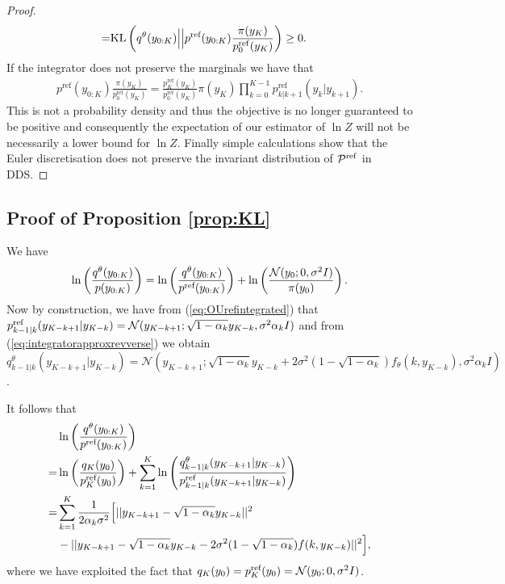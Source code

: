 \documentclass{article} %
\begin{document}
\begin{proof}
\begin{align}
    =&  \KL\left(q^\theta(y_{0:K})\Big|\Big|{p}^{\textup{ref}}(y_{0:K}) \frac{\pi(y_K)}{p_0^{\mathrm{ref}}(y_K)} \right) \geq 0. \nonumber
\end{align}
If the integrator does not preserve the marginals we have that
\begin{align}
     p^{\mathrm{ref}} (y_{0:K})  \frac{\pi(y_K)}{p_0^{\mathrm{ref}}(y_K)} =  \frac{p_K^{\mathrm{ref}}(y_K)}{p_0^{\mathrm{ref}}(y_K)}\pi(y_K)\prod_{k=0}^{K-1}  p^{\mathrm{ref}}_{k| k+1} (y_{k}| y_{k+1}).
\end{align}
This is not a probability density and thus the objective is no longer guaranteed to be positive and consequently the expectation of our estimator of $\ln Z$ will not be necessarily a lower bound for $\ln Z$. Finally simple calculations show that the Euler discretisation does not preserve the invariant distribution of $\gP^{\mathrm{ref}}$ in DDS.
\end{proof}


\subsection{Proof of Proposition \ref{prop:KL}}
We have 
\begin{equation}\label{eq:logRNsum}
    \log \left( \frac{q^{\theta}(y_{0:K})}{p(y_{0:K})}\right)=\log  \left(\frac{q^{\theta}(y_{0:K})}{p^{\textup{ref}}(y_{0:K})}\right)+\log  \left( \frac{\mathcal{N}(y_0;0,\sigma^2 I)}{\pi(y_0)}\right).
\end{equation}
Now by construction, we have from (\ref{eq:OUrefintegrated}) that  $p^{\textup{ref}}_{k-1|k}(y_{K-k+1}|y_{K-k})=\mathcal{N}(y_{K-k+1};\sqrt{1-\alpha_k}y_{K-k},\sigma^2 \alpha_k I)$ and from (\ref{eq:integratorapproxrevverse}) we obtain $q^{\theta}_{k-1|k}(y_{K-k+1}|y_{K-k})=\mathcal{N}(y_{K-k+1};\sqrt{1-\alpha_k}y_{K-k}+2\sigma^2(1-\sqrt{1-\alpha_k})f_{\theta}(k,y_{K-k}),\sigma^2 \alpha_k I)$.

It follows that 
\begin{align}
    &\log  \left(\frac{q^{\theta}(y_{0:K})}{p^{\textup{ref}}(y_{0:K})}\right)  \label{eq:rationvareps1} \\
    =&\log \left( \frac{q_{K}(y_0)}{p^{\textup{ref}}_{K}(y_0)} \right)+\sum_{k=1}^K 
    \log \left( \frac{q^{\theta}_{k-1|k}(y_{K-k+1}|y_{K-k})}{p^{\textup{ref}}_{k-1|k}(y_{K-k+1}|y_{K-k})} \right) \nonumber \\
    =& \sum_{k=1}^K  \frac{1}{2\alpha_k \sigma^2} \Bigr[ ||y_{K-k+1}-\sqrt{1-\alpha_k}y_{K-k}||^2 \nonumber\\
    &- ||y_{K-k+1}-\sqrt{1-\alpha_k}y_{K-k}-2\sigma^2(1-\sqrt{1-\alpha_k})f(k,y_{K-k})||^2 \Bigr], \nonumber
\end{align}
where we have exploited the fact that $q_{K}(y_0)=p^{\textup{ref}}_{K}(y_0)=\mathcal{N}(y_0;0,\sigma^2 I)$.
\end{document}
